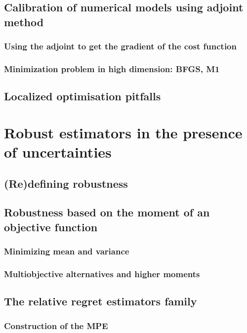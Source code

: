 \documentclass[11pt]{article}
\begin{document}
\subsection{Calibration of numerical models using adjoint method}
\label{sec:orgbc53a8d}
\subsubsection{Using the adjoint to get the gradient of the cost function}
\label{sec:org0a9c33c}
\subsubsection{Minimization problem in high dimension: BFGS, M1}
\label{sec:orgc1889fb}
\subsection{Localized optimisation pitfalls}
\label{sec:org0ce1036}
\section{Robust estimators in the presence of uncertainties}
\label{sec:orge2c326e}
\subsection{(Re)defining robustness}
\label{sec:orge7830a6}
\subsection{Robustness based on the moment of an objective function}
\label{sec:org84fb772}
\subsubsection{Minimizing mean and variance}
\label{sec:orga915ddb}
\subsubsection{Multiobjective alternatives and higher moments}
\label{sec:orgf7aaf9b}
\subsection{The relative regret estimators family}
\label{sec:org700ffe9}
\subsubsection{Construction of the MPE}
\label{sec:org0fca75d}
\end{document}
